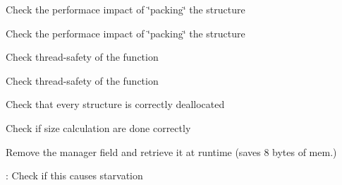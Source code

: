 
\begin{DoxyRefList}
\item[Global \mbox{\hyperlink{types_8h_a0c005c0a22e0c7fd81ee588076782ee5}{\+\_\+\+\_\+attribute\+\_\+\+\_\+}} ((packed)) g\+\_\+flags\+\_\+t]\label{todo__todo000009}%
%
Check the performace impact of \char`\"{}packing\char`\"{} the structure 
\item[Global \mbox{\hyperlink{types_8h_a0c005c0a22e0c7fd81ee588076782ee5}{\+\_\+\+\_\+attribute\+\_\+\+\_\+}} ((packed)) g\+\_\+flags\+\_\+t]\label{todo__todo000009}%
%
Check the performace impact of \char`\"{}packing\char`\"{} the structure 
\item[Global \mbox{\hyperlink{message_8h_a96f6cac0e44546c1adb5e9cfe5751d7b}{copy\+\_\+msg\+\_\+from\+\_\+user}} (msg\+\_\+t $\ast$kmsg, const int8\+\_\+t $\ast$umsg, const ssize\+\_\+t \+\_\+size)]\label{todo__todo000006}%
%
Check thread-\/safety of the function  
\item[Global \mbox{\hyperlink{message_8h_ab6d9c803d56dffb71a6f8979d5aeeaa0}{copy\+\_\+msg\+\_\+to\+\_\+user}} (const msg\+\_\+t $\ast$kmsg, \+\_\+\+\_\+user int8\+\_\+t $\ast$ubuffer, const ssize\+\_\+t \+\_\+size)]\label{todo__todo000005}%
%
Check thread-\/safety of the function  
\item[Global \mbox{\hyperlink{main__device_8h_a48d8e84c8660710553f0beddd8b95b6a}{main\+Exit}} (void)]\label{todo__todo000003}%
%
Check that every structure is correctly deallocated  
\item[Global \mbox{\hyperlink{message_8h_aba1d8514abde9dfb52f2fb006fd5dbf1}{queue\+Garbage\+Collector}} (struct work\+\_\+struct $\ast$work)]\label{todo__todo000007}%
%
Check if size calculation are done correctly 
\item[Class \mbox{\hyperlink{structt__message__delayed__deliver}{t\+\_\+message\+\_\+delayed\+\_\+deliver}} ]\label{todo__todo000008}%
%
Remove the \textquotesingle{}manager\textquotesingle{} field and retrieve it at runtime (saves 8 bytes of mem.)  
\item[Global \mbox{\hyperlink{group__manager_8h_a7a4a1f2ed5563df3defd7477a8f70168}{unregister\+Group\+Device}} (\mbox{\hyperlink{structgroup__data}{group\+\_\+data}} $\ast$grp\+\_\+data, bool flag)]\label{todo__todo000001}%
%
\+: Check if this causes starvation 
\end{DoxyRefList}